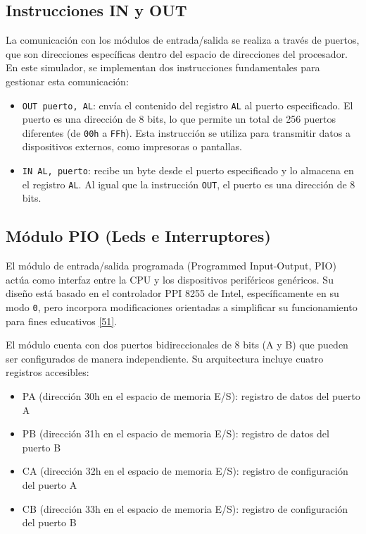 \documentclass[12pt,oneside]{templates/unerthesis}
\providecommand{\tightlist}{%
  \setlength{\itemsep}{0pt}\setlength{\parskip}{0pt}}
\begin{document}
\hypertarget{instrucciones-in-y-out}{%
\subsection{Instrucciones IN y OUT}\label{instrucciones-in-y-out}}

La comunicación con los módulos de entrada/salida se realiza a través de puertos, que son direcciones específicas dentro del espacio de direcciones del procesador. En este simulador, se implementan dos instrucciones fundamentales para gestionar esta comunicación:

\begin{itemize}
\tightlist
\item
  \texttt{OUT\ puerto,\ AL}: envía el contenido del registro \texttt{AL} al puerto especificado. El puerto es una dirección de 8 bits, lo que permite un total de 256 puertos diferentes (de \texttt{00h} a \texttt{FFh}). Esta instrucción se utiliza para transmitir datos a dispositivos externos, como impresoras o pantallas.
\item
  \texttt{IN\ AL,\ puerto}: recibe un byte desde el puerto especificado y lo almacena en el registro \texttt{AL}. Al igual que la instrucción \texttt{OUT}, el puerto es una dirección de 8 bits.
\end{itemize}

\hypertarget{muxf3dulo-pio-leds-e-interruptores}{%
\subsection{Módulo PIO (Leds e Interruptores)}\label{muxf3dulo-pio-leds-e-interruptores}}

El módulo de entrada/salida programada (Programmed Input-Output, PIO) actúa como interfaz entre la CPU y los dispositivos periféricos genéricos. Su diseño está basado en el controlador PPI 8255 de Intel, específicamente en su modo \texttt{0}, pero incorpora modificaciones orientadas a simplificar su funcionamiento para fines educativos \protect\hyperlink{ref-intel8086manual}{{[}51{]}}.

El módulo cuenta con dos puertos bidireccionales de 8 bits (A y B) que pueden ser configurados de manera independiente. Su arquitectura incluye cuatro registros accesibles:

\begin{itemize}
\tightlist
\item
  PA (dirección 30h en el espacio de memoria E/S): registro de datos del puerto A
\item
  PB (dirección 31h en el espacio de memoria E/S): registro de datos del puerto B
\item
  CA (dirección 32h en el espacio de memoria E/S): registro de configuración del puerto A
\item
  CB (dirección 33h en el espacio de memoria E/S): registro de configuración del puerto B
\end{itemize}
\end{document}
